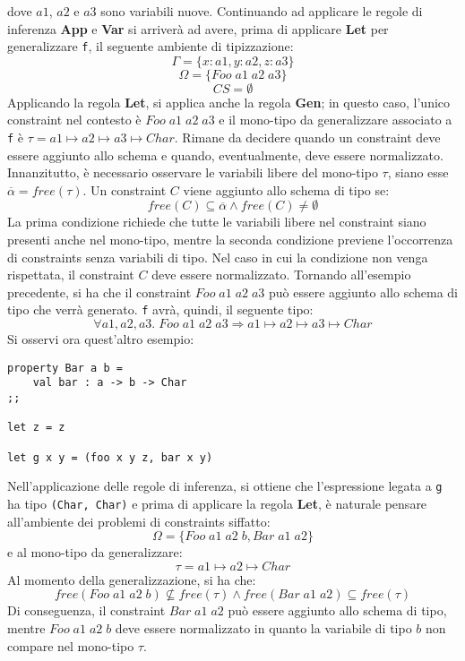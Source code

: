 \documentclass[10pt,a4paper]{article}
\begin{document}
dove $ a1 $, $ a2 $ e $ a3 $ sono variabili nuove. Continuando ad applicare le regole di inferenza \textbf{App} e
\textbf{Var} si arriverà ad avere, prima di applicare \textbf{Let} per generalizzare \texttt{f}, il seguente
ambiente di tipizzazione:
\[ \Gamma = \{ x : a1, y : a2, z : a3 \} \]
\[ \Omega = \{ Foo \; a1 \; a2 \; a3 \} \]
\[ CS = \emptyset \]
Applicando la regola \textbf{Let}, si applica anche la regola \textbf{Gen}; in questo caso, l'unico constraint
nel contesto è $ Foo \; a1 \; a2 \; a3 $ e il mono-tipo da generalizzare associato a \texttt{f} è
$ \tau = a1 \mapsto a2 \mapsto a3 \mapsto Char $. Rimane da decidere quando un constraint deve essere aggiunto allo
schema e quando, eventualmente, deve essere normalizzato. Innanzitutto, è necessario osservare le variabili libere
del mono-tipo $ \tau $, siano esse $ \overline{\alpha} = free(\tau) $. Un constraint $ C $ viene aggiunto allo schema
di tipo se:
\[ free(C) \subseteq \overline{\alpha} \wedge free(C) \neq \emptyset \]
La prima condizione richiede che tutte le variabili libere nel constraint siano presenti anche nel mono-tipo, mentre
la seconda condizione previene l'occorrenza di constraints senza variabili di tipo. Nel caso in cui la condizione non
venga rispettata, il constraint $ C $ deve essere normalizzato. Tornando all'esempio precedente, si ha che
il constraint $ Foo \; a1 \; a2 \; a3 $ può essere aggiunto allo schema di tipo che verrà generato.
\texttt{f} avrà, quindi, il seguente tipo:
\[ \forall a1, a2, a3. \; Foo \; a1 \; a2 \; a3 \Rightarrow a1 \mapsto a2 \mapsto a3 \mapsto Char \]
Si osservi ora quest'altro esempio:
\begin{lstlisting}
property Bar a b =
    val bar : a -> b -> Char
;;

let z = z

let g x y = (foo x y z, bar x y)
\end{lstlisting}
Nell'applicazione delle regole di inferenza, si ottiene che l'espressione legata a \texttt{g} ha tipo
\texttt{(Char, Char)} e prima di applicare la regola \textbf{Let}, è naturale pensare all'ambiente dei problemi di
constraints siffatto:
\[ \Omega = \{ Foo \; a1 \; a2 \; b, Bar \; a1 \; a2 \} \]
e al mono-tipo da generalizzare:
\[ \tau = a1 \mapsto a2 \mapsto Char \]
Al momento della generalizzazione, si ha che:
\[ free(Foo \; a1 \; a2 \; b) \not\subseteq free(\tau) \wedge free(Bar \; a1 \; a2) \subseteq free(\tau) \]
Di conseguenza, il constraint $ Bar \; a1 \; a2 $ può essere aggiunto allo schema di tipo, mentre
$ Foo \; a1 \; a2 \; b $ deve essere normalizzato in quanto la variabile di tipo $ b $ non compare nel mono-tipo $ \tau $.
\end{document}
